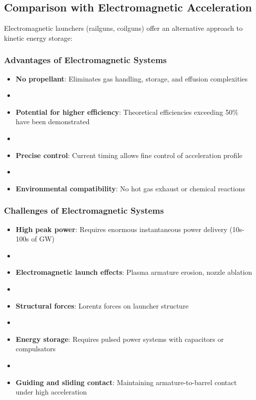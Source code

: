 \documentclass[12pt]{article}
\begin{document}
\subsection{Comparison with Electromagnetic Acceleration}
Electromagnetic launchers (railguns, coilguns) offer an alternative approach to kinetic energy storage:

\subsubsection{Advantages of Electromagnetic Systems}
\begin{itemize}
    \item \textbf{No propellant}: Eliminates gas handling, storage, and effusion complexities
    \item \item \textbf{Potential for higher efficiency}: Theoretical efficiencies exceeding 50\% have been demonstrated
    \item \item \textbf{Precise control}: Current timing allows fine control of acceleration profile
    \item \item \textbf{Environmental compatibility}: No hot gas exhaust or chemical reactions
\end{itemize}

\subsubsection{Challenges of Electromagnetic Systems}
\begin{itemize}
    \item \textbf{High peak power}: Requires enormous instantaneous power delivery (10s-100s of GW)
    \item \item \textbf{Electromagnetic launch effects}: Plasma armature erosion, nozzle ablation
    \item \item \textbf{Structural forces}: Lorentz forces on launcher structure
    \item \item \textbf{Energy storage}: Requires pulsed power systems with capacitors or compulsators
    \item \item \textbf{Guiding and sliding contact}: Maintaining armature-to-barrel contact under high acceleration
\end{itemize}
\end{document}
